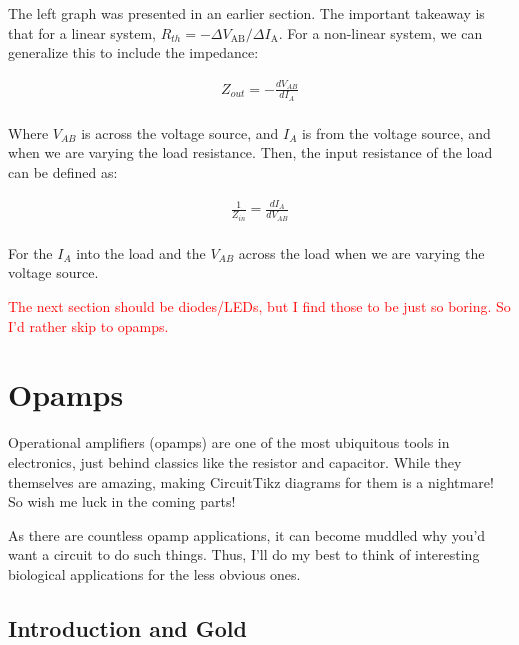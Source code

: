 The left graph was presented in an earlier section. The important takeaway is that for a linear system, $R_{th} = -\Delta V_{\mathrm{AB}}/\Delta I_{\mathrm{A}}$. For a non-linear system, we can generalize this to include the impedance: 


\begin{equation} \label{out}
\begin{split}
Z_{out} = -\frac{dV_{AB}}{dI_A}\\
\end{split}
\end{equation}

Where $V_{AB}$ is across the voltage source, and $I_A$ is from the voltage source, and when we are varying the load resistance. Then, the input resistance of the load can be defined as: 


\begin{equation} \label{in}
\begin{split}
\frac{1}{Z_{in}} = \frac{dI_{A}}{dV_{AB}}\\
\end{split}
\end{equation}

For the $I_A$ into the load and the $V_{AB}$ across the load when we are varying the voltage source. 


\textcolor{red}{The next section should be diodes/LEDs, but I find those to be just so boring. So I'd rather skip to opamps.}

\vfill

\chapter{Opamps}

Operational amplifiers (opamps) are one of the most ubiquitous tools in electronics, just behind classics like the resistor and capacitor. While they themselves are amazing, making CircuitTikz diagrams for them is a nightmare! So wish me luck in the coming parts!\newline

As there are countless opamp applications, it can become muddled why you'd want a circuit to do such things. Thus, I'll do my best to think of interesting biological applications for the less obvious ones. 

\section{Introduction and Gold}

